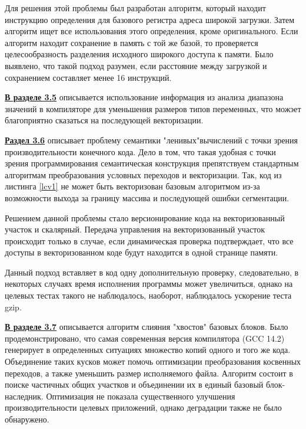 Для решения этой проблемы был разработан алгоритм,
который находит инструкцию определения для базового регистра адреса широкой
загрузки. Затем алгоритм ищет все использования этого определения,
кроме оригинального. Если алгоритм находит сохранение в память с той же
базой, то проверяется целесообразность разделения исходного широкого доступа
к памяти. Было выявлено, что такой подход разумен, если расстояние
между загрузкой и сохранением составляет менее 16 инструкций.
 
 
 
 \underline{\textbf{В разделе 3.5}} описывается использование информация из анализа диапазона значений в компиляторе для уменьшения размеров типов переменных, что можэет благоприятно сказаться на последующей векторизации. 
 
  \underline{\textbf{Раздел 3.6}} описывает проблему семантики "ленивых"\phantom{ }вычислений с точки зрения производительности конечного кода. Дело в том, что такая удобная с точки зрения программирования семантическая конструкция препятствуем стандартным алгоритмам  преобразования условных переходов и векторизации. Так, код из листинга \ref{lcv1} не может быть векторизован базовым алгоритмом из-за возможности выхода за границу массива и последующей ошибки сегментации.
  
 
Решением данной проблемы стало версионирование кода на векторизованный участок и скалярный.  Передача управления на векторизованный участок происходит  только в случае, если динамическая проверка подтверждает, что все доступы в векторизованном коде будут находится в одной странице памяти.
 
 Данный подход вставляет в код одну дополнительную проверку, следовательно,
 в некоторых случаях время исполнения программы может увеличиться,
 однако на целевых тестах такого не наблюдалось, наоборот, наблюдалось ускорение
 теста gzip.
 
  \underline{\textbf{В разделе 3.7}} описывается алгоритм слияния "хвостов"\phantom{ } базовых блоков.  Было продемонстрировано, что самая  современная версия компилятора (GCC 14.2) генерирует в определенных ситуациях множество копий одного и того же кода. Объединение таких кусков может помочь оптимизации преобразования косвенных переходов, а также уменьшить размер исполняемого файла.  Алгоритм состоит в поиске частичных общих участков и объединении их  в единый базовый блок-наследник.  Оптимизация  не показала существенного улучшения производительности целевых приложений, однако деградации также не было обнаружено.
 
